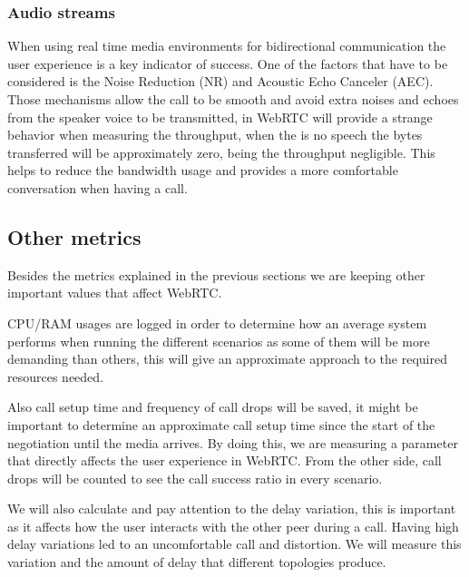\subsubsection{Audio streams}

When using real time media environments for bidirectional communication the user experience is a key indicator of success. One of the factors that have to be considered is the Noise Reduction (NR) and Acoustic Echo Canceler (AEC). Those mechanisms allow the call to be smooth and avoid extra noises and echoes from the speaker voice to be transmitted, in WebRTC will provide a strange behavior when measuring the throughput, when the is no speech the bytes transferred will be approximately zero, being the throughput negligible. This helps to reduce the bandwidth usage and provides a more comfortable conversation when having a call.

\subsection{Other metrics}

Besides the metrics explained in the previous sections we are keeping other important values that affect WebRTC.

CPU/RAM usages are logged in order to determine how an average system performs when running the different scenarios as some of them will be more demanding than others, this will give an approximate approach to the required resources needed.

Also call setup time and frequency of call drops will be saved, it might be important to determine an approximate call setup time since the start of the negotiation until the media arrives. By doing this, we are measuring a parameter that directly affects the user experience in WebRTC. From the other side, call drops will be counted to see the call success ratio in every scenario.

We will also calculate and pay attention to the delay variation, this is important as it affects how the user interacts with the other peer during a call. Having high delay variations led to an uncomfortable call and distortion. We will measure this variation and the amount of delay that different topologies produce.
